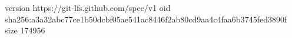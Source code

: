 version https://git-lfs.github.com/spec/v1
oid sha256:a3a32abc77ce1b50dcbf05ae541ac8446f2ab80cd9aa4c4faa6b3745fed3890f
size 174956
